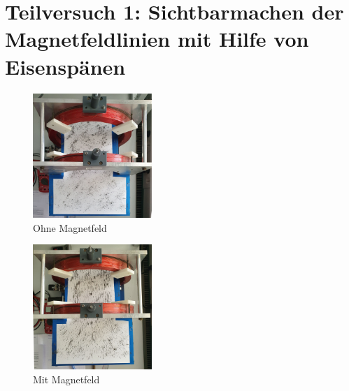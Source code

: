 \section{Teilversuch 1: Sichtbarmachen der Magnetfeldlinien mit Hilfe von Eisenspänen}
	\begin{multicols}{2}
		\begin{figure}[H]
			\centering
			\includegraphics[width=0.4\textwidth]{./images/tv1-before-small.jpg}
			\caption{Ohne Magnetfeld}
		\end{figure}
		\begin{figure}[H]
			\centering
			\includegraphics[width=0.4\textwidth]{./images/tv1-after-small.jpg}
			\caption{Mit Magnetfeld}
		\end{figure}
	\end{multicols}
